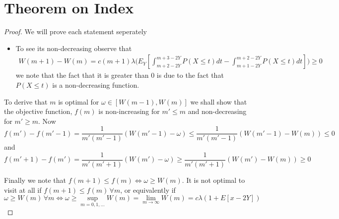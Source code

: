 \documentclass[a4paper,10pt]{article}
\theoremstyle{definition}
\theoremstyle{definition}
\theoremstyle{remark}
\theoremstyle{definition}
\begin{document}


\appendix
{}
\appendixpage
\addappheadtotoc

\section{Theorem on Index}
\label{Appendix: theorem on index}
\begin{proof}
We will prove each statement seperately
\begin{itemize}
\item To see its non-decreasing observe that
\begin{align*}
W(m+1)-W(m)= c(m+1) \lambda \Bigg(E_{Y} \left[\int_{m+2-2Y}^{m+3-2Y} P(X \leq t) dt -\int_{m+1-2Y}^{m+2-2Y} P(X \leq t)dt \right] \Bigg) \geq 0
\end{align*}
we note that the fact that it is greater than 0 is due to the fact that $P(X \leq t )$ is a non-decreasing function.
\end{itemize}

\item To derive that $m$ is optimal for $\omega \in [W(m-1),W(m)]$ we shall show that the objective function, $f(m)$ is non-increasing for $m' \leq m$ and non-decreasing for $m' \geq m$.
Now 
$$f(m')-f(m'-1)=\frac{1}{m'(m'-1)} (W(m'-1)-\omega) \leq \frac{1}{m'(m'-1)} (W(m'-1)-W(m)) \leq 0$$
and
$$f(m'+1)-f(m')=\frac{1}{m'(m'+1)} (W(m') -\omega) \geq \frac{1}{m'(m'+1)} (W(m')-W(m)) \geq 0$$

\item Finally we note that $f(m+1) \leq f(m) \iff \omega \geq W(m)$. It is not optimal to visit at all if $f(m+1) \leq f(m) \, \forall m$, or equivalently
if $$\omega \geq W(m) \, \forall m \iff \omega \geq \sup\limits_{m=0,1,...} W(m)=\lim\limits_{m \rightarrow \infty} W(m)=c \lambda (1+ E[x-2Y])$$
\end{proof}
\end{document}
